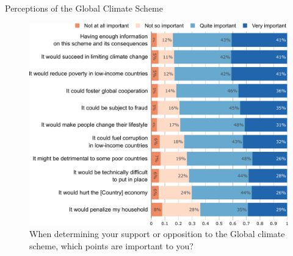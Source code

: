 \documentclass[aspectratio=169,xcolor=dvipsnames, 11pt,mathserif]{beamer}
\begin{document}
\begin{framefont}{\small}
\begin{frame}{Perceptions of the Global Climate Scheme \hyperlink{gcs_support}{}\label{gcs_perceptions}}
	\vspace{-.3cm}
    \begin{figure}
        \centering 
        \caption{When determining your support or opposition to the Global climate scheme, which points are important to you?}
        \vspace{-.2cm}
        \includegraphics[height=.9\textheight]{../figures/all/gcs_important.pdf} 
    \end{figure}
\end{frame}


\end{framefont}
\end{document}
